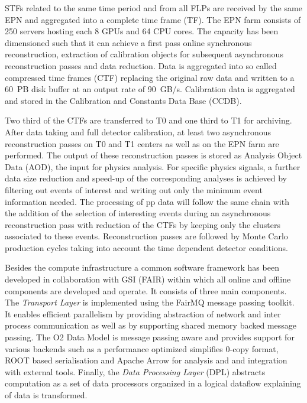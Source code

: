 STFs related to the same time period and from all FLPs are received by the same EPN and aggregated into 
a complete time frame (TF).
The EPN farm consists of 250 servers hosting each 8 GPUs and 
64 CPU cores. The capacity has been dimensioned such that it can achieve
a first pass online synchronous reconstruction, extraction of calibration 
objects for subsequent asynchronous reconstruction passes and data reduction. 
Data is aggregated into so called compressed time frames (CTF) replacing the original raw data and 
written to a 
60~PB disk buffer at an output rate of 90~GB/s. Calibration data is aggregated and stored in the 
Calibration and Constants Data Base (CCDB). 

Two third of the CTFs are transferred to T0 and one third to T1 for archiving. 
After data taking and full detector calibration, at least two asynchronous 
reconstruction passes on T0 and T1 centers as well as on the EPN farm are 
performed. The output of these reconstruction passes is stored as Analysis 
Object Data (AOD), the input for physics analysis. For specific physics signals, a further data size 
reduction and speed-up of the corresponding analyses is achieved by filtering out events of interest and writing out only the minimum event information needed.
The processing of pp data will follow the same chain with the addition of the selection of interesting 
events during an asynchronous reconstruction pass with reduction of the CTFs by keeping only the 
clusters associated to these events. Reconstruction passes are followed by Monte Carlo production cycles taking into account the time dependent detector conditions.

Besides the compute infrastructure a common software framework has
been developed in collaboration with GSI (FAIR) within which all 
online and offline components are developed and operate. It 
consists of three main components. 
The {\it Transport Layer} is implemented using the FairMQ message 
passing toolkit. It enables efficient parallelism by providing 
abstraction of network and inter process communication as well as 
by supporting shared memory backed message passing. The {O2 Data 
Model} is message passing aware and provides support for various 
backends such as a performance optimized simplifies 0-copy format, ROOT based serialisation and Apache Arrow for analysis and and 
integration with external tools. Finally, the {\it Data Processing
Layer} (DPL) abstracts computation as a set of data processors 
organized in a logical dataflow explaining of data is transformed.

